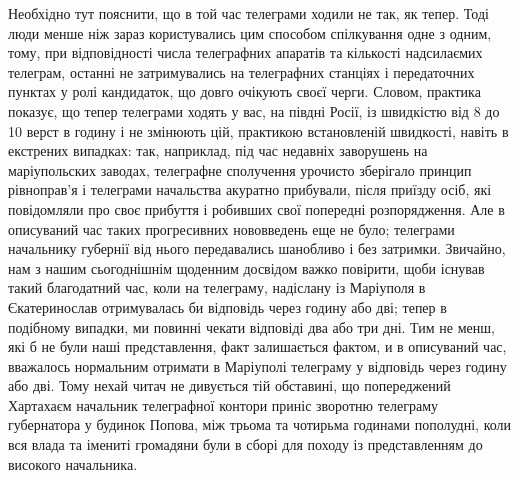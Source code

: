 \documentclass[a4paper,20pt]{report}
\begin{document}
Необхідно тут пояснити, що в той час телеграми ходили не так, як тепер. Тоді
люди менше ніж зараз користувались цим способом спілкування одне з одним, тому,
при відповідності числа телеграфних апаратів та кількості надсилаємих телеграм,
останні не затримувались на телеграфних станціях і передаточних пунктах у ролі
кандидаток, що довго очікують своєї черги. Словом, практика показує, що тепер
телеграми ходять у вас, на півдні Росії, із швидкістю від 8 до 10 верст в годину
і не змінюють цій, практикою встановленій швидкості, навіть в екстрених
випадках: так, наприклад, під час недавніх заворушень на маріупольских заводах,
телеграфне сполучення урочисто зберігало принцип рівноправ'я і телеграми
начальства акуратно прибували, після приїзду осіб, які повідомляли про своє
прибуття і робивших свої попередні розпорядження. Але в описуваний час таких
прогресивних нововведень еще не було; телеграми начальнику губернії від нього
передавались шанобливо і без затримки. Звичайно, нам з нашим сьогоднішнім щоденним
досвідом важко повірити, щоби існував такий благодатний час, коли на телеграму,
надіслану із Маріуполя в Єкатеринослав отримувалась би відповідь через годину
або дві; тепер в подібному випадки, ми повинні чекати відповіді два або три дні. Тим не менш,
які б не були наші представлення, факт залишається фактом, и в описуваний час, вважалось нормальним 
отримати в Маріуполі телеграму у відповідь через годину або дві. Тому нехай
читач не дивується тій обставині, що попереджений Хартахаєм начальник
телеграфної контори приніс зворотню телеграму губернатора у будинок Попова, між
трьома та чотирьма годинами пополудні, коли вся влада та імениті громадяни були
в сборі для походу із представленням до високого начальника.
\end{document}
